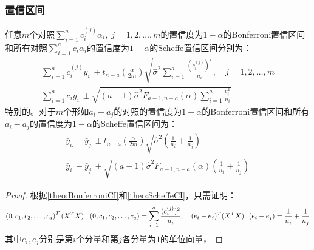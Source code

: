 \subsubsection{置信区间}
\begin{theorem}
	任意$m$个对照$\sum\limits_{i=1}^{a}c_i^{(j)}\alpha_i,\;j=1,2,\dots,m$的置信度为$1-\alpha$的Bonferroni置信区间和所有对照$\sum\limits_{i=1}^{a}c_i\alpha_i$的置信度为$1-\alpha$的Scheffe置信区间分别为：
	\begin{gather*}
		\sum_{i=1}^{a}c_i^{(j)}\bar{y}_{i.}\pm t_{n-a}\left(\frac{\alpha}{2m}\right)\sqrt{\hat{\sigma}^2\sum_{i=1}^{a}\frac{(c_i^{(j)})^2}{n_i}},\quad j=1,2,\dots,m \\
		\sum_{i=1}^{a}c_i\bar{y}_{i.}\pm\sqrt{(a-1)\hat{\sigma}^2F_{a-1,n-a}(\alpha)\sum_{i=1}^{a}\frac{c_i^2}{n_i}}
	\end{gather*}
	特别的。对于$m$个形如$a_i-a_j$的对照的置信度为$1-\alpha$的Bonferroni置信区间和所有$a_i-a_j$的置信度为$1-\alpha$的Scheffe置信区间为：
	\begin{gather*}
		\bar{y}_{i.}-\bar{y}_{j.}\pm t_{n-a}\left(\frac{\alpha}{2m}\right)\sqrt{\hat{\sigma}^2\left(\frac{1}{n_i}+\frac{1}{n_j}\right)} \\
		\bar{y}_{i.}-\bar{y}_{j.}\pm\sqrt{(a-1)\hat{\sigma}^2F_{a-1,n-a}(\alpha)\left(\frac{1}{n_i}+\frac{1}{n_j}\right)}
	\end{gather*}
\end{theorem}
\begin{proof}
	根据\cref{theo:BonferroniCI}和\cref{theo:ScheffeCI}，只需证明：
	\begin{equation*}
		\left(0,c_1, c_2, \dots, c_{a}\right)^T(X^TX)^-\left(0,c_1, c_2, \dots, c_{a}\right)=\sum_{i=1}^{a}\frac{(c_i^{(j)})^2}{n_i},\quad(e_i-e_j)^T(X^TX)^-(e_i-e_j)=\frac{1}{n_i}+\frac{1}{n_j}
	\end{equation*}
	其中$e_i,e_j$分别是第$i$个分量和第$j$各分量为$1$的单位向量，
\end{proof}